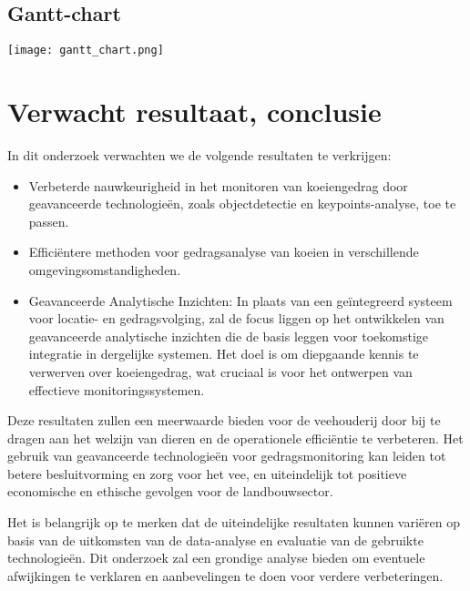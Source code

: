 \subsection{Gantt-chart}
\newline
\texttt{[image: gantt\_chart.png]}
\newline
\section{Verwacht resultaat, conclusie}%
\label{sec:verwachte_resultaten}
In dit onderzoek verwachten we de volgende resultaten te verkrijgen:
\begin{itemize}
  \item Verbeterde nauwkeurigheid in het monitoren van koeiengedrag door geavanceerde technologieën, zoals objectdetectie en \newline keypoints-analyse, toe te passen.
  \item Efficiëntere methoden voor gedragsanalyse van koeien in verschillende omgevingsomstandigheden.
  \item Geavanceerde Analytische Inzichten: In plaats van een geïntegreerd systeem voor locatie- en gedragsvolging, zal de focus liggen op het ontwikkelen van geavanceerde analytische inzichten die de basis leggen voor toekomstige integratie in dergelijke systemen. Het doel is om diepgaande kennis te verwerven over koeiengedrag, wat cruciaal is voor het ontwerpen van effectieve monitoringssystemen.
\end{itemize}
Deze resultaten zullen een meerwaarde bieden voor de veehouderij door bij te dragen aan het welzijn van dieren en de operationele efficiëntie te verbeteren. Het gebruik van geavanceerde technologieën voor gedragsmonitoring kan leiden tot betere besluitvorming en zorg voor het vee, en uiteindelijk tot positieve economische en ethische gevolgen voor de landbouwsector.

Het is belangrijk op te merken dat de uiteindelijke resultaten kunnen variëren op basis van de uitkomsten van de data-analyse en evaluatie van de gebruikte technologieën. 
Dit onderzoek zal een grondige analyse bieden om eventuele afwijkingen te verklaren en aanbevelingen te doen voor verdere verbeteringen.

